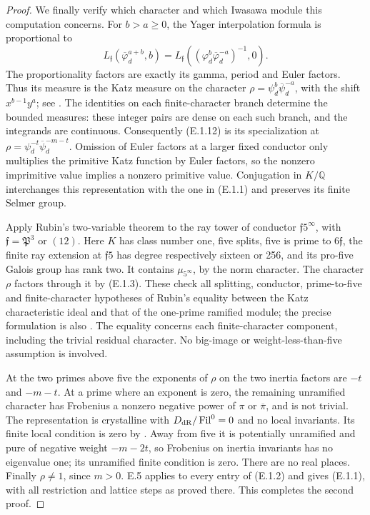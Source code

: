 \begin{proof}
We finally verify which character and which Iwasawa module
this computation concerns. For \(b>a\ge0\), the Yager
interpolation formula is proportional to
\[
 L_{\mathfrak f}(\overline\varphi_d^{a+b},b)
 =L_{\mathfrak f}((\varphi_d^b\overline\varphi_d^{-a})^{-1},0).
                                                               \tag{E.1.13}
\]
The proportionality factors are exactly its gamma, period
and Euler factors. Thus its measure is the Katz measure
on the character \(\rho=\psi_d^b\overline\psi_d^{-a}\),
with the shift \(x^{b-1}y^a\); see
\cite[Theorems 3.7 and 3.11]{DE_BannaiKobayashi2007}.
The identities on each finite-character branch determine
the bounded measures: these integer pairs are dense on
each such branch, and the integrands are continuous.
Consequently (E.1.12) is its specialization at
\(\rho=\psi_d^{-t}\overline\psi_d^{-m-t}\).
Omission of Euler factors at a larger fixed conductor
only multiplies the primitive Katz function by Euler
factors, so the nonzero imprimitive value implies a
nonzero primitive value. Conjugation in \(K/\mathbb Q\)
interchanges this representation with the one in (E.1.1)
and preserves its finite Selmer group.

Apply Rubin's two-variable theorem to the ray tower of
conductor \(\mathfrak f5^\infty\), with
\(\mathfrak f=\mathfrak P^3\) or \((12)\).
Here \(K\) has class number one, five splits, five is
prime to \(6\mathfrak f\), the finite ray extension at
\(\mathfrak f5\) has degree respectively sixteen or
256, and its pro-five Galois group has rank two.
It contains \(\mu_{5^\infty}\), by the norm character.
The character \(\rho\) factors through it by (E.1.3).
These check all splitting, conductor, prime-to-five and
finite-character hypotheses of Rubin's equality between
the Katz characteristic ideal and that of the one-prime
ramified module; the precise formulation is also
\cite[Theorem 3.3.1]{DE_BCGKPST}.
The equality \cite[Theorem 4.1(i)]{DE_Rubin1991} concerns each finite-character component,
including the trivial residual character. No big-image
or weight-less-than-five assumption is involved.

At the two primes above five the exponents of \(\rho\)
on the two inertia factors are \(-t\) and \(-m-t\).
At a prime where an exponent is zero, the remaining unramified
character has Frobenius a nonzero negative power of
\(\pi\) or \(\overline\pi\), and is not trivial.
The representation is crystalline with
\(D_{\rm dR}/\operatorname{Fil}^0=0\) and no local
invariants. Its finite local condition is zero by
\cite[Corollary 3.8.4]{DE_BlochKato1990}. Away from five
it is potentially unramified and pure of negative weight
\(-m-2t\), so Frobenius on inertia invariants has no
eigenvalue one; its unramified finite condition is zero.
There are no real places. Finally \(\rho\ne1\), since
\(m>0\). E.5 applies to every entry of (E.1.2) and gives
(E.1.1), with all restriction and lattice steps as proved
there. This completes the second proof.
\end{proof}

